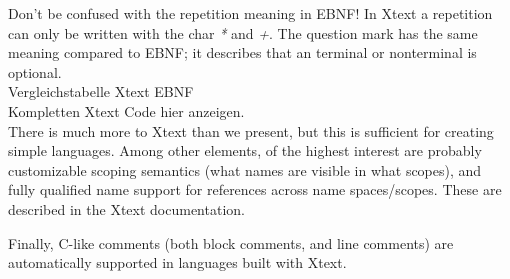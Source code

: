 \documentclass[a4paper,10pt]{article}
\begin{document}
Don't be confused with the repetition meaning in EBNF! In Xtext a repetition can only be written with the char \emph{*} and \emph{+}. The question mark has the same meaning compared to EBNF; it describes that an terminal or nonterminal is optional.\\

Vergleichstabelle Xtext EBNF\\
Kompletten Xtext Code hier anzeigen.\\

There is much more to Xtext than we present, but this is sufficient for creating simple languages. Among other elements, of the highest interest are probably customizable scoping semantics (what names are visible in what scopes), and fully qualified name support for references across name spaces/scopes. These are described in the Xtext documentation.

Finally, C-like comments (both block comments, and line comments) are automatically supported in languages built with Xtext.
\end{document}
